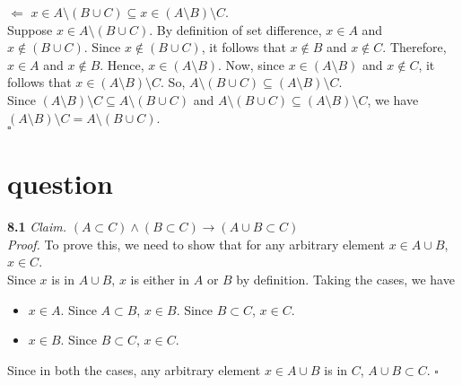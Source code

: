 \documentclass[11pt]{article}
\begin{document}
\noindent $\Leftarrow$ $x \in A \setminus (B \cup C) \subseteq x \in (A \setminus B) \setminus C$.\\
    Suppose $x \in A \setminus (B \cup C)$.
    By definition of set difference, $x \in A$ and $x \notin (B \cup C)$.
    Since $x \notin (B \cup C)$, it follows that $x \notin B$ and $x \notin C$.
    Therefore, $x \in A$ and $x \notin B$.
    Hence, $x \in (A \setminus B)$.
    Now, since $x \in (A \setminus B)$ and $x \notin C$, it follows that $x \in (A \setminus B) \setminus C$. So, $A \setminus (B \cup C) \subseteq (A \setminus B) \setminus C$.
\medskip \\
Since $(A \setminus B) \setminus C \subseteq A \setminus (B \cup C)$ and $A \setminus (B \cup C) \subseteq (A \setminus B) \setminus C$, we have $(A \setminus B) \setminus C = A \setminus (B \cup C)$. \\ \text{ } \hfill $\square$







\section{question} 
\textbf{8.1 } \emph{Claim. } $(A \subset C) \land (B \subset C) \rightarrow (A \cup B \subset C)$\medskip \\
\emph{Proof. } To prove this, we need to show that for any arbitrary element $x \in A \cup B$, $x \in C$. \\
Since $x$ is in $A \cup B$, $x$ is either in $A$ or $B$ by definition. Taking the cases, we have
\begin{itemize}
\renewcommand{\labelitemi}{$\hookrightarrow$}
    \item $x \in A$. Since $A \subset B$, $x \in B$. Since $B \subset C$, $x \in C$.
    \item $x \in B$. Since $B \subset C$, $x \in C$.
\end{itemize}
Since in both the cases, any arbitrary element $x \in A \cup B$ is in $C$, $A \cup B \subset C$. \hfill $\square$


\vspace{15pt}
\end{document}
